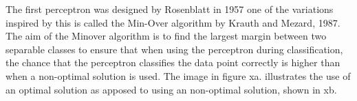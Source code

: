 The first perceptron was designed by Rosenblatt in 1957 one of the variations inspired by this is called the Min-Over algorithm by Krauth and Mezard, 1987.   The aim of the Minover algorithm is to find the largest margin between two separable classes to ensure that when using the perceptron during classification, the chance that the perceptron classifies the data point correctly is higher than when a non-optimal solution is used. The image in figure xa. illustrates the use of an optimal solution as apposed to using an non-optimal solution, shown in xb.


